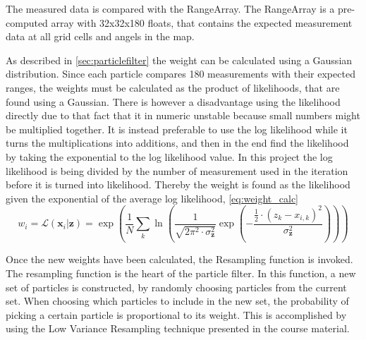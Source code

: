 \documentclass[Main]{subfiles}
\begin{document}
	The measured data is compared with the RangeArray. The RangeArray is a pre-computed array with 32x32x180 floats, that contains the expected measurement data at all grid cells and angels in the map.
		
	As described in \autoref{sec:particlefilter} the weight can be calculated using a Gaussian distribution.
	Since each particle compares 180 measurements with their expected ranges, the weights must be calculated as the product of likelihoods, that are found using a Gaussian.
	There is however a disadvantage using the likelihood directly due to that fact that it in numeric unstable because small numbers might be multiplied together.
	It is instead preferable to use the log likelihood while it turns the multiplications into additions, and then in the end find the likelihood by taking the exponential to the log likelihood value.
	In this project the log likelihood is being divided by the number of measurement used in the iteration before it is turned into likelihood.
	Thereby the weight is found as the likelihood given the exponential of the average log likelihood, \autoref{eq:weight_calc}	
	\begin{equation}
	\label{eq:weight_calc}
	w_i = \mathcal{L} (\mathbf{x}_i|\mathbf{z}) = \exp \left( \frac{1}{N} \displaystyle\sum_k \ln \left( \frac{1}{\sqrt{2\pi^2 \cdot \sigma_\mathbf{z}^2}} \exp \left( - \frac{\frac{1}{2}\cdot (z_k-x_{i,k})^2}{\sigma_\mathbf{z}^2} \right) \right) \right)
	\end{equation}
	
	\newpage
	Once the new weights have been calculated, the Resampling function is invoked. 
	The resampling function is the heart of the particle filter.
	In this function, a new set of particles is constructed, by randomly choosing particles from the current set.
	When choosing which particles to include in the new set, the probability of picking a certain particle is proportional to its weight.
	This is accomplished by using the Low Variance Resampling technique presented in the course material.
\end{document}
